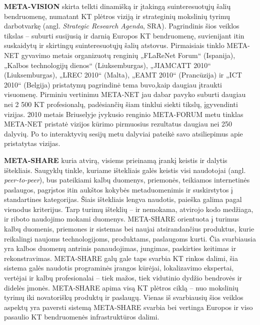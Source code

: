 \begin{multicols}{2}
\textbf{META-VISION}  skirta telkti dinamišką ir įtakingą suinteresuotųjų šalių bendruomenę, numatant KT plėtros viziją ir strateginių mokslinių tyrimų darbotvarkę (angl. \textit{Strategic Research Agenda}, SRA). Pagrindinis šios veiklos tikslas – suburti susijusią ir darnią Europos KT bendruomenę, suvienijant itin suskaidytų ir skirtingų suinteresuotųjų šalių atstovus. Pirmaisiais tinklo META-NET gyvavimo metais organizuotų renginių „FLaReNet Forum“ (Ispanija), „Kalbos technologijų dienos“ (Liuksemburgas), „JIAMCATT 2010“ (Liuksemburgas), „LREC 2010“ (Malta), „EAMT 2010“ (Prancūzija) ir „ICT 2010“ (Belgija) pristatymų pagrindinė tema buvo,kaip daugiau įtraukti visuomenę. Pirminiu vertinimu META-NET jau dabar pavyko suburti daugiau nei 2 500 KT profesionalų, padėsiančių šiam tinklui siekti tikslų, įgyvendinti vizijas. 2010 metais Briuselyje įvykusio renginio META-FORUM metu tinklas META-NET pristatė vizijos kūrimo pirmuosius rezultatus daugiau nei 250 dalyvių. Po to interaktyvių sesijų metu dalyviai pateikė savo atsiliepimus apie pristatytas vizijas.

\textbf{META-SHARE} kuria atvirą, visiems prieinamą įrankį keistis ir dalytis ištekliais. Saugyklų tinkle, kuriame ištekliais galės keistis visi naudotojai (angl. \textit{peer-to-peer}), bus pateikiami kalbų duomenys, priemonės, teikiamos internetinės paslaugos, pagrįstos itin aukštos kokybės metaduomenimis ir suskirstytos į standartines kategorijas. Šiais ištekliais lengva naudotis, paieška galima pagal vienodus kriterijus. Tarp turimų išteklių – ir nemokama, atvirojo kodo medžiaga, ir riboto naudojimo mokami duomenys. META-SHARE orientuota į turimus kalbų duomenis, priemones ir sistemas bei naujai atsirandančius produktus, kurie reikalingi naujoms technologijoms, produktams, paslaugoms kurti. Čia svarbiausia yra kalbos duomenų antrinis panaudojimas, jungimas, paskirties keitimas ir rekonstravimas. META-SHARE galų gale taps svarbia KT rinkos dalimi, šia sistema galės naudotis programinės įrangos kūrėjai, lokalizavimo ekspertai, vertėjai ir kalbų profesionalai – tiek mažos, tiek vidutinio dydžio bendrovės ir didelės įmonės. META-SHARE apima visą KT plėtros ciklą – nuo mokslinių tyrimų iki novatoriškų produktų ir paslaugų. Vienas iš svarbiausių šios veiklos aspektų yra paversti sistemą META-SHARE svarbia bei vertinga Europos ir viso pasaulio KT bendruomenės infrastruktūros dalimi.


\end{multicols}
